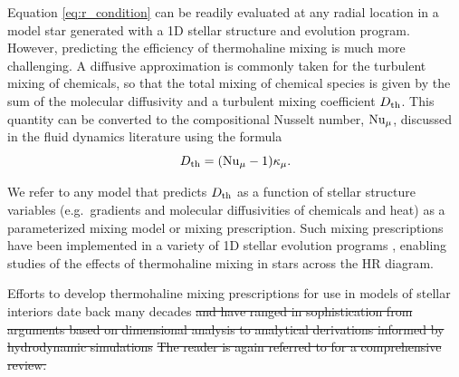 %
Equation \eqref{eq:r_condition} 
can be readily evaluated at any radial location in a model star generated with a 1D stellar structure and evolution program. However, predicting the efficiency of thermohaline mixing is much more challenging. A diffusive approximation is commonly taken for the turbulent mixing of chemicals, so that the total mixing of chemical species is given by the sum of the molecular diffusivity and a turbulent mixing coefficient $D_\mathrm{th}$. This quantity can be converted to the compositional Nusselt number, $\mathrm{Nu}_\mu$, discussed in the fluid dynamics literature using the formula
\begin{equation} \label{eq:Dth_from_Nu}
    \Dth = (\Numu - 1)\kappa_\mu.
\end{equation}

We refer to any model that predicts $D_\mathrm{th}$ as a function of stellar structure variables (e.g.~gradients and molecular diffusivities of chemicals and heat) as a parameterized mixing model or mixing prescription. 
Such mixing prescriptions have been implemented in a variety of 1D stellar evolution programs \citep[see][and references therein]{lattanzio_etal_2015}, enabling studies of the effects of thermohaline mixing in stars across the HR diagram.

    Efforts to develop thermohaline mixing prescriptions for use in models of stellar interiors date back many decades \sout{and have ranged in sophistication from arguments based on dimensional analysis to analytical derivations informed by hydrodynamic simulations  } 
\sout{The reader is again referred to \citet{garaud_DDC_review_2018} for a comprehensive review. } 


